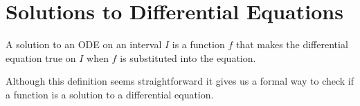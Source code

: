 \section{Solutions to Differential Equations}
\begin{definition}
	A solution to an ODE on an interval $I$ is a function $f$ that makes the differential equation true on $I$ when $f$ is substituted into the equation.
\end{definition}
\noindent
Although this definition seems straightforward it gives us a formal way to check if a function is a solution to a differential equation.

